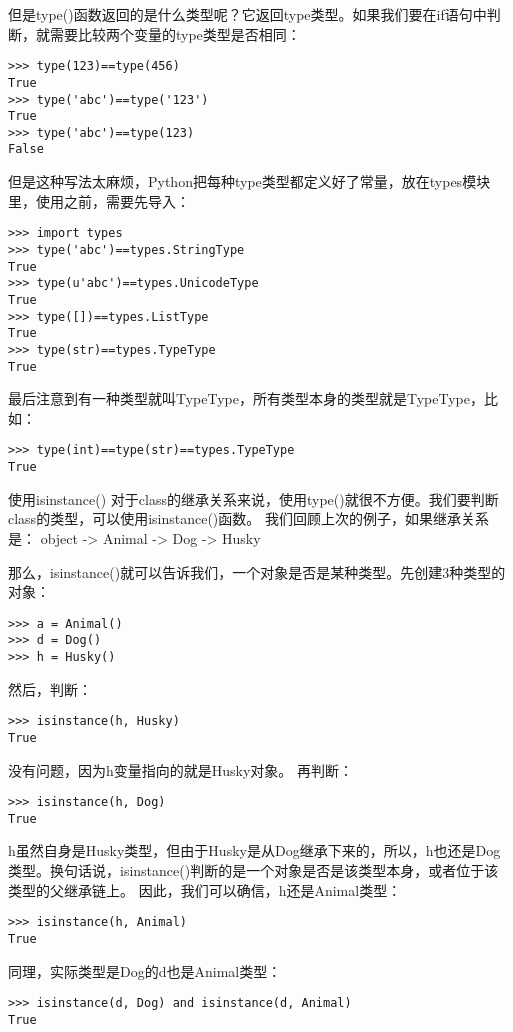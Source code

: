 \documentclass[twoside,11pt]{book}
\begin{document}
但是type()函数返回的是什么类型呢？它返回type类型。如果我们要在if语句中判断，就需要比较两个变量的type类型是否相同：
\begin{lstlisting}
>>> type(123)==type(456)
True
>>> type('abc')==type('123')
True
>>> type('abc')==type(123)
False
\end{lstlisting}

但是这种写法太麻烦，Python把每种type类型都定义好了常量，放在types模块里，使用之前，需要先导入：
\begin{lstlisting}
>>> import types
>>> type('abc')==types.StringType
True
>>> type(u'abc')==types.UnicodeType
True
>>> type([])==types.ListType
True
>>> type(str)==types.TypeType
True
\end{lstlisting}

最后注意到有一种类型就叫TypeType，所有类型本身的类型就是TypeType，比如：
\begin{lstlisting}
>>> type(int)==type(str)==types.TypeType
True
\end{lstlisting}

使用isinstance()
对于class的继承关系来说，使用type()就很不方便。我们要判断class的类型，可以使用isinstance()函数。
我们回顾上次的例子，如果继承关系是：
object -> Animal -> Dog -> Husky

那么，isinstance()就可以告诉我们，一个对象是否是某种类型。先创建3种类型的对象：
\begin{lstlisting}
>>> a = Animal()
>>> d = Dog()
>>> h = Husky()
\end{lstlisting}

然后，判断：
\begin{lstlisting}
>>> isinstance(h, Husky)
True
\end{lstlisting}

没有问题，因为h变量指向的就是Husky对象。
再判断：
\begin{lstlisting}
>>> isinstance(h, Dog)
True
\end{lstlisting}

h虽然自身是Husky类型，但由于Husky是从Dog继承下来的，所以，h也还是Dog类型。换句话说，isinstance()判断的是一个对象是否是该类型本身，或者位于该类型的父继承链上。
因此，我们可以确信，h还是Animal类型：
\begin{lstlisting}
>>> isinstance(h, Animal)
True
\end{lstlisting}

同理，实际类型是Dog的d也是Animal类型：
\begin{lstlisting}
>>> isinstance(d, Dog) and isinstance(d, Animal)
True
\end{lstlisting}
\end{document}
